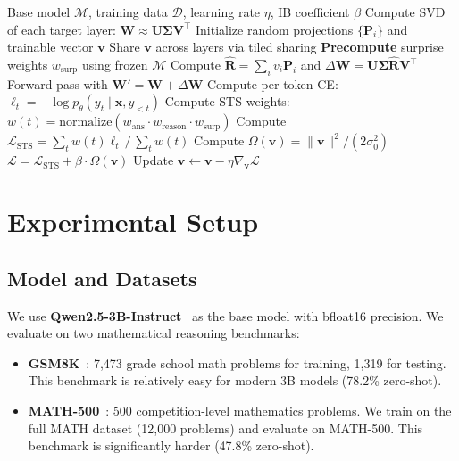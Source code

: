 \documentclass{article}
\newcommand{\bv}{\mathbf{v}}
\newcommand{\bP}{\mathbf{P}}
\newcommand{\bU}{\mathbf{U}}
\newcommand{\bV}{\mathbf{V}}
\newcommand{\bW}{\mathbf{W}}
\newcommand{\bR}{\hat{\mathbf{R}}}
\begin{document}

\begin{algorithm}[t]
\caption{SIB-TinyLoRA Training}
\label{alg:sib}
\begin{algorithmic}[1]
\Require Base model $\mathcal{M}$, training data $\mathcal{D}$, learning rate $\eta$, IB coefficient $\beta$
\State Compute SVD of each target layer: $\bW \approx \bU\boldsymbol{\Sigma}\bV^\top$
\State Initialize random projections $\{\bP_i\}$ and trainable vector $\bv$
\State Share $\bv$ across layers via tiled sharing
\State \textbf{Precompute} surprise weights $w_{\text{surp}}$ using frozen $\mathcal{M}$ 
  \State Compute $\bR = \sum_i v_i \bP_i$ and $\Delta\bW = \bU\boldsymbol{\Sigma}\bR\bV^\top$
  \State Forward pass with $\bW' = \bW + \Delta\bW$
  \State Compute per-token CE: $\ell_t = -\log p_\theta(y_t \mid \mathbf{x}, y_{<t})$
  \State Compute STS weights: $w(t) = \text{normalize}(w_{\text{ans}} \cdot w_{\text{reason}} \cdot w_{\text{surp}})$
  \State Compute $\mathcal{L}_{\text{STS}} = \sum_t w(t) \ell_t \,/\, \sum_t w(t)$
  \State Compute $\Omega(\bv) = \|\bv\|^2 / (2\sigma_0^2)$
  \State $\mathcal{L} = \mathcal{L}_{\text{STS}} + \beta \cdot \Omega(\bv)$
  \State Update $\bv \leftarrow \bv - \eta \nabla_{\bv} \mathcal{L}$
\EndFor
\end{algorithmic}
\end{algorithm}

\section{Experimental Setup}
\label{sec:experiments}

\subsection{Model and Datasets}

We use \textbf{Qwen2.5-3B-Instruct}~\citep{qwen2025qwen25} as the base model with bfloat16 precision. We evaluate on two mathematical reasoning benchmarks:

\begin{itemize}[leftmargin=*]
  \item \textbf{GSM8K}~\citep{cobbe2021gsm8k}: 7,473 grade school math problems for training, 1,319 for testing. This benchmark is relatively easy for modern 3B models (78.2\% zero-shot).
  \item \textbf{MATH-500}~\citep{hendrycks2021measuring,lightman2023lets}: 500 competition-level mathematics problems. We train on the full MATH dataset (12,000 problems) and evaluate on MATH-500. This benchmark is significantly harder (47.8\% zero-shot).
\end{itemize}
\end{document}
